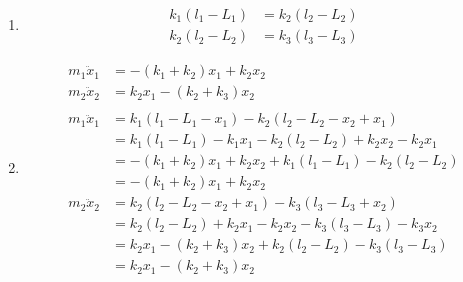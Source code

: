 \documentclass{article}
\begin{document}
\begin{enumerate}
  \item

        \begin{align*}
          k_1 (l_1 - L_1) & = k_2 (l_2 - L_2) \\
          k_2 (l_2 - L_2) & = k_3 (l_3 - L_3)
        \end{align*}

  \item

        \begin{align*}
          m_1 \ddot{x}_1 & = -(k_1 + k_2) x_1 + k_2 x_2                                      \\
          m_2 \ddot{x}_2 & = k_2 x_1 - (k_2 + k_3) x_2                                       \\ \\
          m_1 \ddot{x}_1 & = k_1 (l_1 - L_1 - x_1) - k_2 (l_2 - L_2 - x_2 + x_1)             \\
                         & = k_1 (l_1 - L_1) - k_1 x_1 - k_2 (l_2 - L_2) + k_2 x_2 - k_2 x_1 \\
                         & = -(k_1 + k_2) x_1 + k_2 x_2 + k_1 (l_1 - L_1) - k_2 (l_2 - L_2)  \\
                         & = -(k_1 + k_2) x_1 + k_2 x_2                                      \\
          m_2 \ddot{x}_2 & = k_2 (l_2 - L_2 - x_2 + x_1) - k_3 (l_3 - L_3 + x_2)             \\
                         & = k_2 (l_2 - L_2) + k_2 x_1 - k_2 x_2 - k_3 (l_3 - L_3) - k_3 x_2 \\
                         & = k_2 x_1 - (k_2 + k_3) x_2 + k_2 (l_2 - L_2) - k_3 (l_3 - L_3)   \\
                         & = k_2 x_1 - (k_2 + k_3) x_2
        \end{align*}
\end{enumerate}

\setcounter{subsection}{2}
\subsection{}
\end{document}
